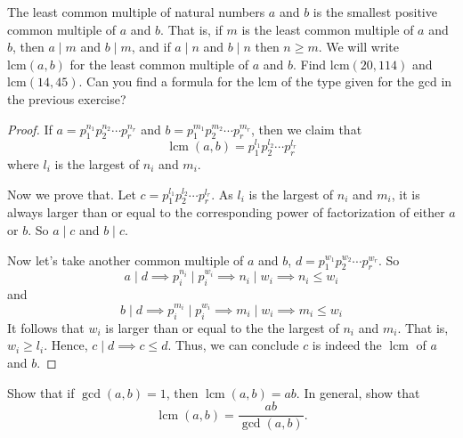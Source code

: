 \documentclass[12pt]{article}
\newenvironment{exercise}[2][Exercise]{\begin{trivlist}
\item[\hskip \labelsep {\bfseries #1}\hskip \labelsep {\bfseries #2.}]}{\end{trivlist}}
\DeclareMathOperator{\lcm}{lcm}
\begin{document}
\begin{exercise}{11}
The least common multiple of natural numbers \(a\) and \(b\) is the smallest positive common multiple of \(a\) and \(b\). That is, if \(m\) is the least common multiple of \(a\) and \(b\), then \(a \mid m\) and \(b \mid m\), and if \(a \mid n\) and \(b \mid n\) then \(n \geq m\). We will write \(\text{lcm}(a, b)\) for the least common multiple of \(a\) and \(b\). Find \(\text{lcm}(20, 114)\) and \(\text{lcm}(14, 45)\). Can you find a formula for the lcm of the type given for the gcd in the previous exercise?
\end{exercise}

\begin{proof}
If $a=p_1^{n_1} p_2^{n_2} \cdots p_r^{n_r}$ and $b = p_1^{m_1} p_2^{m_2} \cdots p_r^{m_r}$, then we claim that
\[
\lcm(a,b) = p_1^{l_1} p_2^{l_2} \cdots p_r^{l_r}
\]
where $l_i$ is the largest of $n_i$ and $m_i$. 

Now we prove that. Let $c=p_1^{l_1} p_2^{l_2} \cdots p_r^{l_r}$. As $l_i$ is the largest of $n_i$ and $m_i$, it is always larger than or equal to the corresponding power of factorization of either $a$ or $b$. So $a\mid c$ and $b\mid c$.

Now let's take another common multiple of $a$ and $b$, $d=p_1^{w_1} p_2^{w_2} \cdots p_r^{w_r}$. So
\[
a \mid d \implies p_i^{n_i} \mid p_i^{w_i} \implies n_i \mid w_i \implies n_i \leq w_i
\]
and 
\[
b \mid d \implies p_i^{m_i} \mid p_i^{w_i} \implies m_i \mid w_i \implies m_i \leq w_i
\]
It follows that $w_i$ is larger than or equal to the the largest of $n_i$ and $m_i$. That is, $w_i \geq l_i$. Hence, $c \mid d \implies c\leq d$. Thus, we can conclude $c$ is indeed the $\lcm$ of $a$ and $b$.
\end{proof}

\begin{exercise}{12}
Show that if \( \gcd(a, b) = 1 \), then \( \lcm(a, b) = ab \). In general, show that \[ \lcm(a, b) = \frac{ab}{\gcd(a, b)}. \]
\end{exercise}
\end{document}
